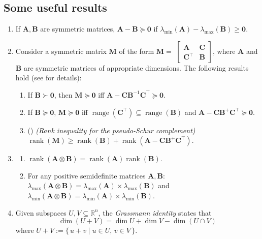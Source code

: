\documentclass[a4paper,fleqn]{cas-sc}
\newcommand{\1}{\mathbf{1}}
\newcommand{\A}{\mathbf{A}}
\newcommand{\bz}{\mathbf{0}}
\newcommand{\B}{\mathbf{B}}
\DeclareMathOperator{\rank}{rank}
\DeclareMathOperator{\range}{range}
\begin{document}
\subsection{Some useful results}
\begin{enumerate}
\setlength\itemsep{1em}
\item  If $\mathbf{A}, \mathbf{B}$ are symmetric matrices, $\mathbf{A} - \mathbf{B} \succeq \bz$ if $\lambda_{\min} (\mathbf{A}) - \lambda_{\max} (\mathbf{B}) \geq \bz$.
 \item Consider a symmetric matrix $\mathbf{M}$ of the form $\mathbf{M} =$ $\begin{bmatrix}
\mathbf{A} & \mathbf{C} \\
\mathbf{C}^{\top} & \mathbf{B}
\end{bmatrix}$, where $\mathbf{A}$ and $\mathbf{B}$ are symmetric matrices of appropriate dimensions. The following results hold (see  \citep{gallier2020schur} for details):
    \begin{enumerate}
        \item If $\mathbf{B} \succ \bz$, then $\mathbf{M} \succeq \bz$ iff $\mathbf{A} - \mathbf{C} \mathbf{B}^{-1} \mathbf{C}^{\top} \succeq \bz$.
        \item If $\mathbf{B} \succeq \bz$, $\mathbf{M} \succeq \mathbf{0}$ iff $\range(\mathbf{C}^{\top}) \subseteq \range(\mathbf{B})$ and $\mathbf{A} - \mathbf{C} \mathbf{B}^{+} \mathbf{C}^{\top} \succeq \mathbf{0}$.
        \item (\cite[Theorem 1]{carlson1974generalization}) \textit{(Rank inequality for the pseudo-Schur complement)} $\rank(\mathbf{M}) \geq \rank(\mathbf{B}) + \rank(\mathbf{A} - \mathbf{C} \mathbf{B}^{+} \mathbf{C}^{\top})$. 
    \end{enumerate} 
\item
\begin{enumerate}
    \item $\rank(\A \otimes \B) =  \rank(\A)\rank(\B)$. 
    \item For any positive semidefinite matrices $\mathbf{A}, \mathbf{B}$: $\lambda_{\max} (\mathbf{A} \otimes \mathbf{B}) = \lambda_{\max} (\mathbf{A}) \times \lambda_{\max} (\mathbf{B})$ and $\lambda_{\min} (\mathbf{A} \otimes \mathbf{B}) = \lambda_{\min} (\mathbf{A}) \times \lambda_{\min} (\mathbf{B})$.
\end{enumerate}

\item Given subspaces $U, V \subseteq \mathbb{R}^n$, the \emph{Grassmann identity} states that
\[
\dim(U+V) = \dim U + \dim V - \dim(U \cap V)
\]
where $U + V := \{\, u + v \mid u \in U,\, v \in V \,\}$.



\end{enumerate}
\end{document}
